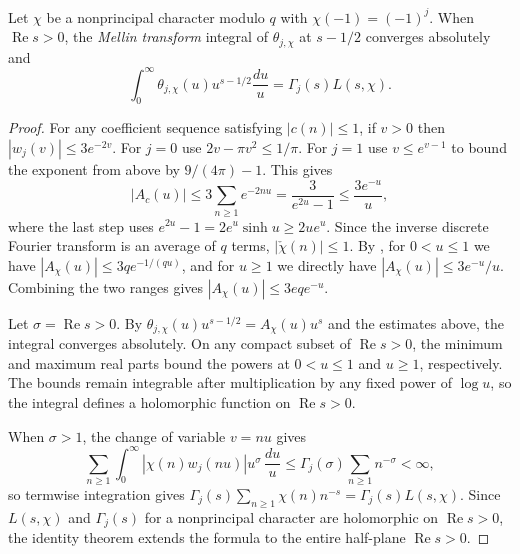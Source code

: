 \begin{lemma}
\label{lem:theta-mellin}
\emitthmsource
Let $\chi$ be a nonprincipal character modulo $q$ with $\chi(-1)=(-1)^j$.
When $\operatorname{Re}s>0$, the \emph{Mellin transform} integral of $\theta_{j,\chi}$ at $s-1/2$ converges absolutely and
\[
 \int_0^\infty\theta_{j,\chi}(u)u^{s-1/2}\frac{du}{u}
   =\Gamma_j(s)L(s,\chi).
\]
\end{lemma}
\begin{proof}
For any coefficient sequence satisfying $|c(n)|\le1$, if $v>0$ then $|w_j(v)|\le3e^{-2v}$.
For $j=0$ use $2v-\pi v^2\le1/\pi$. For $j=1$ use $v\le e^{v-1}$ to bound the exponent from above by $9/(4\pi)-1$.
This gives
\[
 |A_c(u)|\le 3\sum_{n\ge1}e^{-2nu}
 =\frac{3}{e^{2u}-1}\le\frac{3e^{-u}}{u},
\]
where the last step uses $e^{2u}-1=2e^u\sinh u\ge2ue^u$.
Since the inverse discrete Fourier transform is an average of $q$ terms, $|\check\chi(n)|\le1$.
By , for $0<u\le1$ we have
$|A_\chi(u)|\le 3q e^{-1/(qu)}$, and for $u\ge1$ we directly have $|A_\chi(u)|\le 3e^{-u}/u$. Combining the two ranges gives $|A_\chi(u)|\le 3eq e^{-u}$.

Let $\sigma=\operatorname{Re}s>0$. By
$\theta_{j,\chi}(u)u^{s-1/2}=A_\chi(u)u^s$ and the estimates above, the integral converges absolutely. On any compact subset of $\operatorname{Re}s>0$,
the minimum and maximum real parts bound the powers at $0<u\le1$ and $u\ge1$, respectively.
The bounds remain integrable after multiplication by any fixed power of $\log u$, so the integral defines a holomorphic function on $\operatorname{Re}s>0$.

When $\sigma>1$, the change of variable $v=nu$ gives
\[
 \sum_{n\ge1}\int_0^\infty |\chi(n)w_j(nu)|u^\sigma\,\frac{du}{u}
 \le \Gamma_j(\sigma)\sum_{n\ge1} n^{-\sigma}<\infty ,
\]
so termwise integration gives $\Gamma_j(s)\sum_{n\ge1}\chi(n)n^{-s}=\Gamma_j(s)L(s,\chi)$.
Since $L(s,\chi)$ and $\Gamma_j(s)$ for a nonprincipal character are holomorphic on $\operatorname{Re}s>0$, the identity theorem extends the formula to the entire half-plane $\operatorname{Re}s>0$.
\end{proof}

